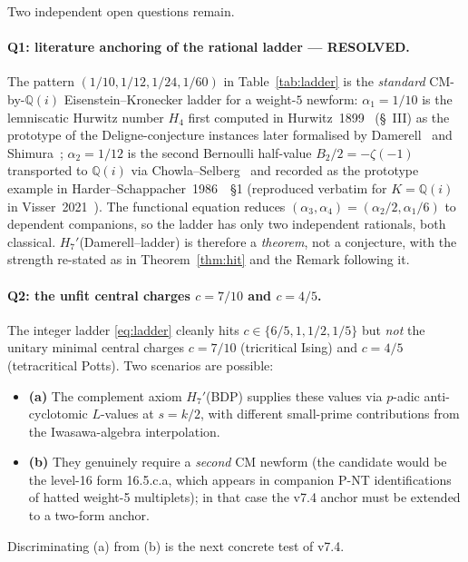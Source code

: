 \documentclass[a4paper,11pt]{article}
\newcommand{\Qi}{\mathbb{Q}(i)}
\theoremstyle{definition}
\theoremstyle{remark}
\begin{document}
Two independent open questions remain.

\paragraph{Q1: literature anchoring of the rational ladder ---
\textbf{RESOLVED}.}
The pattern $(1/10,1/12,1/24,1/60)$ in Table~\ref{tab:ladder} is the
\emph{standard} CM-by-$\Qi$ Eisenstein--Kronecker ladder for a
weight-$5$ newform: $\alpha_1 = 1/10$ is the lemniscatic Hurwitz
number $H_4$ first computed in Hurwitz~1899~\cite{Hurwitz1899}
(\S~III) as the prototype of the Deligne-conjecture instances later
formalised by Damerell~\cite{Damerell71} and
Shimura~\cite{Shimura76}; $\alpha_2 = 1/12$ is the second Bernoulli
half-value $B_2/2 = -\zeta(-1)$ transported to $\Qi$ via
Chowla--Selberg~\cite{ChowSel49} and recorded as the
prototype example in Harder--Schappacher~1986~\cite{HS86}~\S 1
(reproduced verbatim for $K=\Qi$ in Visser~2021~\cite{Visser21}).
The functional equation reduces $(\alpha_3,\alpha_4) = (\alpha_2/2,
\alpha_1/6)$ to dependent companions, so the ladder has only two
independent rationals, both classical.  $H_7'$(Damerell--ladder) is
therefore a \emph{theorem}, not a conjecture, with the strength
re-stated as in Theorem~\ref{thm:hit} and the Remark following it.

\paragraph{Q2: the unfit central charges $c=7/10$ and $c=4/5$.}
The integer ladder \eqref{eq:ladder} cleanly hits
$c\in\{6/5,1,1/2,1/5\}$ but \emph{not} the unitary minimal central
charges $c=7/10$ (tricritical Ising) and $c=4/5$ (tetracritical
Potts).  Two scenarios are possible:
\begin{itemize}
  \item\textbf{(a)} The complement axiom $H_7'$(BDP) supplies these
    values via $p$-adic anti-cyclotomic $L$-values at $s=k/2$, with
    different small-prime contributions from the
    Iwasawa-algebra interpolation.
  \item\textbf{(b)} They genuinely require a \emph{second} CM
    newform (the candidate would be the level-16 form 16.5.c.a, which
    appears in companion P-NT identifications of hatted
    weight-5 multiplets); in that case the v7.4 anchor must be
    extended to a two-form anchor.
\end{itemize}
Discriminating (a) from (b) is the next concrete test of v7.4.
\end{document}
